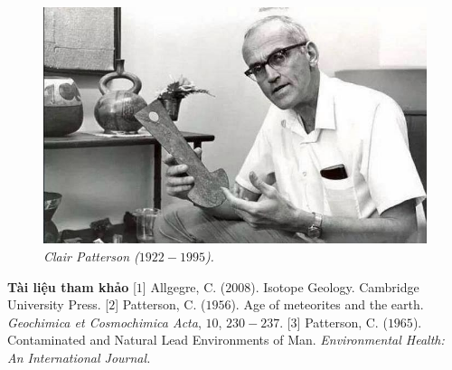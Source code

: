 \begin{multicols}{2}
\begin{figure}[H]
		\includegraphics[width= 1\linewidth]{5}
		\caption{\small\textit{\color{timhieukhoahoc}Clair Patterson ($1922 - 1995$).}}
		\vspace*{-10pt}
	\end{figure}
	\textbf{\color{timhieukhoahoc}Tài liệu tham khảo}
	\vskip 0.1cm
	[$1$] Allgegre, C. ($2008$). Isotope Geology. Cambridge University Press.
	\vskip 0.1cm
	[$2$] Patterson, C. ($1956$). Age of meteorites and the earth. \textit{Geochimica et Cosmochimica Acta}, $10$, $230-237$.
	\vskip 0.1cm
	[$3$] Patterson, C. ($1965$). Contaminated and Natural Lead Environments of Man. \textit{Environmental Health: An International Journal.}
\end{multicols}